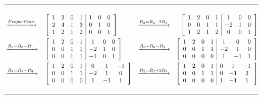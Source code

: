 \documentclass[9pt]{article}
\theoremstyle{plain}
\begin{document}
\begin{enumerate}
	      \[
		      \begin{aligned}
			      \hline                                 \\
			       & \xrightarrow{Proposition}      &  &
			      \left[
				      \begin{array}{cccc|ccc}
					      1 & 2 & 0 & 1 & 1 & 0 & 0 \\
					      2 & 4 & 1 & 3 & 0 & 1 & 0 \\
					      1 & 2 & 1 & 2 & 0 & 0 & 1
				      \end{array}
				      \right]
			       & \xrightarrow{R_2 = R_2 - 2R_1} &  &
			      \left[
				      \begin{array}{cccc|ccc}
					      1 & 2 & 0 & 1 & 1  & 0 & 0 \\
					      0 & 0 & 1 & 1 & -2 & 1 & 0 \\
					      1 & 2 & 1 & 2 & 0  & 0 & 1
				      \end{array}
				      \right]
			      \\
			       & \xrightarrow{R_3 = R_3 - R_1~} &  &
			      \left[
				      \begin{array}{cccc|ccc}
					      1 & 2 & 0 & 1 & 1  & 0 & 0 \\
					      0 & 0 & 1 & 1 & -2 & 1 & 0 \\
					      0 & 0 & 1 & 1 & -1 & 0 & 1
				      \end{array}
				      \right]
			       & \xrightarrow{R_3 = R_3 - R_2~} &  &
			      \left[
				      \begin{array}{cccc|ccc}
					      1 & 2 & 0 & 1 & 1  & 0  & 0 \\
					      0 & 0 & 1 & 1 & -2 & 1  & 0 \\
					      0 & 0 & 0 & 0 & 1  & -1 & 1
				      \end{array}
				      \right]
			      \\
			       & \xrightarrow{R_1 = R_1 - R_3~} &  &
			      \left[
				      \begin{array}{cccc|ccc}
					      1 & 2 & 0 & 1 & 0  & 1  & -1 \\
					      0 & 0 & 1 & 1 & -2 & 1  & 0  \\
					      0 & 0 & 0 & 0 & 1  & -1 & 1
				      \end{array}
				      \right]
			       & \xrightarrow{R_2 = R_2 + 2R_3} &  &
			      \left[
				      \begin{array}{cccc|ccc}
					      1 & 2 & 0 & 1 & 0 & 1  & -1 \\
					      0 & 0 & 1 & 1 & 0 & -1 & 2  \\
					      0 & 0 & 0 & 0 & 1 & -1 & 1
				      \end{array}
				      \right]
			      \\ \\
			      \hline
		      \end{aligned}
	      \]


\end{enumerate}
\end{document}
